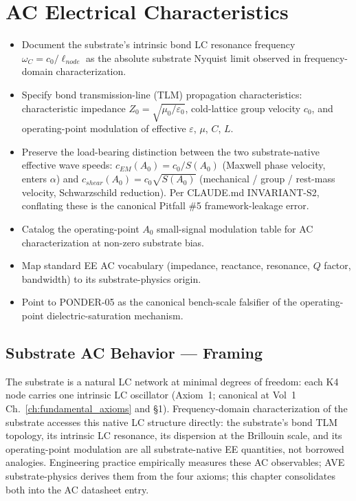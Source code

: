 \chapter{AC Electrical Characteristics}
\label{ch:vol9_ac_electrical_characteristics}

\begin{objectivebox}
\begin{itemize}
    \item Document the substrate's intrinsic bond LC resonance frequency $\omega_C = c_0/\ell_{node}$ as the absolute substrate Nyquist limit observed in frequency-domain characterization.
    \item Specify bond transmission-line (TLM) propagation characteristics: characteristic impedance $Z_0 = \sqrt{\mu_0/\varepsilon_0}$, cold-lattice group velocity $c_0$, and operating-point modulation of effective $\varepsilon$, $\mu$, $C$, $L$.
    \item Preserve the load-bearing distinction between the two substrate-native effective wave speeds: $c_{EM}(A_0) = c_0/S(A_0)$ (Maxwell phase velocity, enters $\alpha$) and $c_{shear}(A_0) = c_0\sqrt{S(A_0)}$ (mechanical / group / rest-mass velocity, Schwarzschild reduction). Per CLAUDE.md INVARIANT-S2, conflating these is the canonical Pitfall \#5 framework-leakage error.
    \item Catalog the operating-point $A_0$ small-signal modulation table for AC characterization at non-zero substrate bias.
    \item Map standard EE AC vocabulary (impedance, reactance, resonance, $Q$ factor, bandwidth) to its substrate-physics origin.
    \item Point to PONDER-05 as the canonical bench-scale falsifier of the operating-point dielectric-saturation mechanism.
\end{itemize}
\end{objectivebox}

\section{Substrate AC Behavior --- Framing}
\label{sec:vol9_ac_framing}

The substrate is a natural LC network at minimal degrees of freedom: each K4 node carries one intrinsic LC oscillator (Axiom~1; canonical at Vol~1 Ch.~\ref{ch:fundamental_axioms} and  \S 1). Frequency-domain characterization of the substrate accesses this native LC structure directly: the substrate's bond TLM topology, its intrinsic LC resonance, its dispersion at the Brillouin scale, and its operating-point modulation are all substrate-native EE quantities, not borrowed analogies. Engineering practice empirically measures these AC observables; AVE substrate-physics derives them from the four axioms; this chapter consolidates both into the AC datasheet entry.

